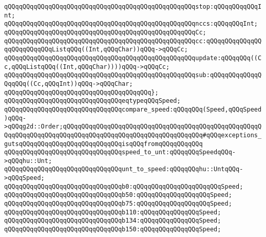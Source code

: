 \verb|qQQqqQQqqQQqqQQqqQQqqQQqqQQqqQQqqQQqqQQqqQQqqQQqqQQqstop:qQQqqQQqqQQqInt;|\newline
\newline
\verb|qQQqqQQqqQQqqQQqqQQqqQQqqQQqqQQqqQQqqQQqqQQqqQQqqQQqnccs:qQQqqQQqInt;|\newline
\newline
\verb|qQQqqQQqqQQqqQQqqQQqqQQqqQQqqQQqqQQqqQQqqQQqqQQqqQQqCc;|\newline
\newline
\verb|qQQqqQQqqQQqqQQqqQQqqQQqqQQqqQQqqQQqqQQqqQQqqQQqqQQqcc:qQQqqQQqqQQqqQQqqQQqqQQqqQQqListqQQq((Int,qQQqChar))qQQq->qQQqCc;|\newline
\verb|qQQqqQQqqQQqqQQqqQQqqQQqqQQqqQQqqQQqqQQqqQQqqQQqqQQqupdate:qQQqqQQq((Cc,qQQqListqQQq((Int,qQQqChar))))qQQq->qQQqCc;|\newline
\verb|qQQqqQQqqQQqqQQqqQQqqQQqqQQqqQQqqQQqqQQqqQQqqQQqqQQqsub:qQQqqQQqqQQqqQQqqQQq((Cc,qQQqInt))qQQq->qQQqChar;|\newline
\verb|qQQqqQQqqQQqqQQqqQQqqQQqqQQqqQQqqQQqqQQq};|\newline
\newline
\verb|qQQqqQQqqQQqqQQqqQQqqQQqqQQqqQQqeqtypeqQQqSpeed;|\newline
\verb|qQQqqQQqqQQqqQQqqQQqqQQqqQQqqQQqcompare_speed:qQQqqQQq(Speed,qQQqSpeed)qQQq->qQQqg2d::Order;qQQqqQQqqQQqqQQqqQQqqQQqqQQqqQQqqQQqqQQqqQQqqQQqqQQqqQQqqQQqqQQqqQQqqQQqqQQqqQQqqQQqqQQqqQQqqQQqqQQqqQQqqQQq#qQQqexceptions_gutsqQQqqQQqqQQqqQQqqQQqqQQqqQQqisqQQqfromqQQqqQQqqQQq|\newline
\verb|qQQqqQQqqQQqqQQqqQQqqQQqqQQqqQQqspeed_to_unt:qQQqqQQqSpeedqQQq->qQQqhu::Unt;|\newline
\verb|qQQqqQQqqQQqqQQqqQQqqQQqqQQqqQQqunt_to_speed:qQQqqQQqhu::UntqQQq->qQQqSpeed;|\newline
\verb|qQQqqQQqqQQqqQQqqQQqqQQqqQQqqQQqb0:qQQqqQQqqQQqqQQqqQQqqQQqSpeed;|\newline
\verb|qQQqqQQqqQQqqQQqqQQqqQQqqQQqqQQqb50:qQQqqQQqqQQqqQQqqQQqSpeed;|\newline
\verb|qQQqqQQqqQQqqQQqqQQqqQQqqQQqqQQqb75:qQQqqQQqqQQqqQQqqQQqSpeed;|\newline
\verb|qQQqqQQqqQQqqQQqqQQqqQQqqQQqqQQqb110:qQQqqQQqqQQqqQQqSpeed;|\newline
\verb|qQQqqQQqqQQqqQQqqQQqqQQqqQQqqQQqb134:qQQqqQQqqQQqqQQqSpeed;|\newline
\verb|qQQqqQQqqQQqqQQqqQQqqQQqqQQqqQQqb150:qQQqqQQqqQQqqQQqSpeed;|\newline

